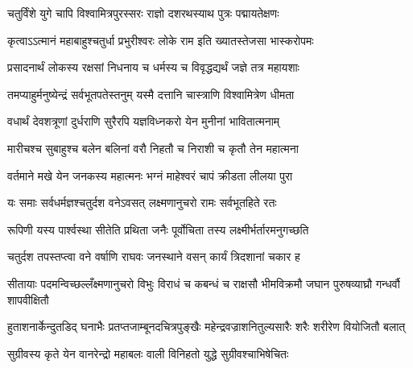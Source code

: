 

\storymeta



\addtocounter{shlokacount}{120}

\twolineshloka
{चतुर्विंशे युगे चापि विश्वामित्रपुरस्सरः}
{राज्ञो दशरथस्याथ पुत्रः पद्मायतेक्षणः}%

\twolineshloka
{कृत्वाऽऽत्मानं महाबाहुश्चतुर्धा प्रभुरीश्वरः}
{लोके राम इति ख्यातस्तेजसा भास्करोपमः}%

\twolineshloka
{प्रसादनार्थं लोकस्य रक्षसां निधनाय च}
{धर्मस्य च विवृद्धद्यर्थं जज्ञे तत्र महायशाः}%

\twolineshloka
{तमप्याहुर्मनुष्येन्द्रं सर्वभूतपतेस्तनुम्}
{यस्मै दत्तानि चास्त्राणि विश्वामित्रेण धीमता}%

\twolineshloka
{वधार्थं देवशत्रूणां दुर्धराणि सुरैरपि}
{यज्ञविध्नकरो येन मुनीनां भावितात्मनाम्}%

\twolineshloka
{मारीचश्च सुबाहुश्च बलेन बलिनां वरौ}
{निहतौ च निराशी च कृतौ तेन महात्मना}%

\twolineshloka
{वर्तमाने मखे येन जनकस्य महात्मनः} 
{भग्नं माहेश्वरं चापं क्रीडता लीलया पुरा} %

\twolineshloka
{यः समाः सर्वधर्मज्ञश्चतुर्दश वनेऽवसत्}
{लक्ष्मणानुचरो रामः सर्वभूतहिते रतः}%

\twolineshloka
{रूपिणी यस्य पार्श्वस्था सीतेति प्रथिता जनैः}
{पूर्वोचिता तस्य लक्ष्मीर्भर्तारमनुगच्छति}%

\twolineshloka
{चतुर्दश तपस्तप्त्वा वने वर्षाणि राघवः}
{जनस्थाने वसन् कार्यं त्रिदशानां चकार ह}%


\threelineshloka
{सीतायाः पदमन्विच्छल्लँक्ष्मणानुचरो विभुः}
{विराधं च कबन्धं च राक्षसौ भीमविक्रमौ}
{जघान पुरुषव्याघ्रौ गन्धर्वौ शापवीक्षितौ}%

\twolineshloka
{हुताशनार्केन्दुतडिद् घनाभैः प्रतप्तजाम्बूनदचित्रपुङ्खैः}
{महेन्द्रवज्राशनितुल्यसारैः शरैः शरीरेण वियोजितौ बलात्}%

\twolineshloka
{सुग्रीवस्य कृते येन वानरेन्द्रो महाबलः}
{वाली विनिहतो युद्धे सुग्रीवश्चाभिषेचितः}%

